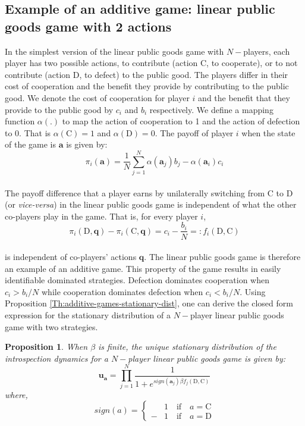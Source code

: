 \documentclass[11pt]{article}
\theoremstyle{plainCl1}
\newtheorem{Prop}{Proposition}
\theoremstyle{plainCl2}
\newcommand{\abf}{\mathbf{a}}
\newcommand{\qbf}{\mathbf{q}}
\newcommand{\ubf}{\mathbf{u}}
\newcommand{\C}{\mathrm{C}}
\newcommand{\D}{\mathrm{D}}
\begin{document}
\subsection*{Example of an additive game: linear public goods game with 2 actions}
In the simplest version of the linear public goods game with $N-$players, each player has two possible actions, to contribute (action $\C$, to cooperate), or to not contribute (action $\D$, to defect) to the public good. The players differ in their cost of cooperation and the benefit they provide by contributing to the public good. We denote the cost of cooperation for player $i$ and the benefit that they provide to the public good by $c_i$ and $b_i$ respectively. We define a mapping function $\alpha(.)$ to map the action of cooperation to 1 and the action of defection to 0. That is $\alpha(\C) = 1$ and $\alpha(\D) = 0$.  The payoff of player $i$ when the state of the game is $\abf$ is given by: \\
\begin{equation}
\pi_i(\abf) = \frac{1}{N}\sum_{j=1}^N \displaystyle \alpha(\abf_j) b_j - \alpha(\abf_i) c_i
\label{Eq:linear-pgg-payoff}
\end{equation}
\\
\noindent The payoff difference that a player earns by unilaterally switching from $\C$ to $\D$ (or \emph{vice-versa}) in the linear public goods game is independent of what the other co-players play in the game. That is, for every player $i$,
\begin{equation}
\pi_i(\D, \qbf) - \pi_i(\C, \qbf) = c_i - \frac{b_i}{N} =: f_i(\D, \C) 
\label{Eq:difference-payoffs-lpgg}
\end{equation}\\
\noindent is independent of co-players' actions $\qbf$. The linear public goods game is therefore an example of an additive game. This property of the game results in easily identifiable dominated strategies. Defection dominates cooperation when $c_i > b_i/N$ while cooperation dominates defection when $c_i < b_i/N$. Using Proposition \ref{Th:additive-games-stationary-dist}, one can derive the closed form expression for the stationary distribution of a $N-$player linear public goods game with two strategies. 
\newpage
\begin{Prop}
\label{prop:stationary-dist-lpgg}
When $\beta$ is finite, the unique stationary distribution of the introspection dynamics for a $N-$player linear public goods game is given by: 
\\
\begin{equation}
\ubf_\abf = \prod_{j = 1}^{N} \frac{1}{1 + \displaystyle e^{\mathit{sign}(\abf_j)\beta f_j(\D, \C )}} 
\label{Eq:stationary_dist_lpgg}
\end{equation}
where, 
\begin{equation}
\label{Eq:sign-function}
\mathit{sign}(a) =
\begin{cases}
&1 \quad \text{if} \quad a = \C \\
-&1 \quad \text{if} \quad a = \D
\end{cases}
\end{equation} \\
\end{Prop}
\end{document}
